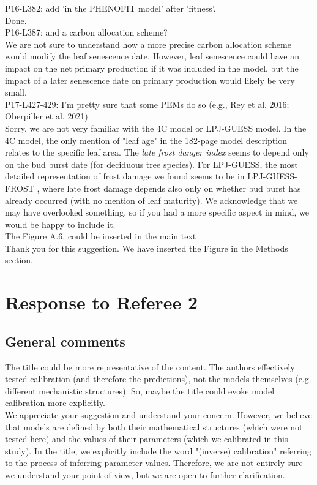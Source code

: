 \documentclass[a4paper, 11pt]{article}
\begin{document}
\noindent P16-L382: add 'in the PHENOFIT model' after 'fitness'.\\
\textcolor{customblue}{Done.}\\

\noindent P16-L387: and a carbon allocation scheme?\\
\textcolor{customblue}{We are not sure to understand how a more precise carbon allocation scheme would modify the leaf senescence date. However, leaf senescence could have an impact on the net primary production if it was included in the model, but the impact of a later senescence date on primary production would likely be very small.}\\

\noindent P17-L427-429: I'm pretty sure that some PEMs do so (e.g., Rey et al. 2016; Oberpiller et al. 2021)\\
\textcolor{customblue}{Sorry, we are not very familiar with the 4C model or LPJ-GUESS model. In the 4C model, the only mention of "leaf age" in \href{https://www.pik-potsdam.de/4c/web_4c/documents/4C_\%20description.pdf}{the 182-page model description}  relates to the specific leaf area. The \emph{late frost danger index} seems to depend only on the bud burst date (for deciduous tree species). For LPJ-GUESS, the most detailed representation of frost damage we found seems to be in LPJ-GUESS-FROST \citep{Meyer2024}, where late frost damage depends also only on whether bud burst has already occurred (with no mention of leaf maturity). We acknowledge that we may have overlooked something, so if you had a more specific aspect in mind, we would be happy to include it.}\\

\noindent The Figure A.6. could be inserted in the main text\\
\textcolor{customblue}{Thank you for this suggestion. We have inserted the Figure in the Methods section.}\\

\section{Response to Referee 2}

\subsection{General comments}

The title could be more representative of the content. The authors effectively tested calibration (and therefore the predictions), not the models themselves (e.g. different mechanistic structures). So, maybe the title could evoke model calibration more explicitly.\\
\textcolor{customblue}{We appreciate your suggestion and understand your concern. However, we believe that models are defined by both their mathematical structures (which were not tested here) and the values of their parameters (which we calibrated in this study). In the title, we explicitly include the word "(inverse) calibration" referring to the process of inferring parameter values. Therefore, we are not entirely sure we understand your point of view, but we are open to further clarification.}\\
\end{document}
